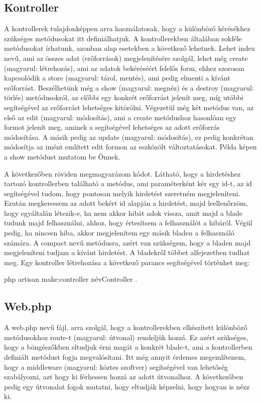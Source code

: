 \documentclass[]{thesis-ekf}
\theoremstyle{definition}
\theoremstyle{remark}
\begin{document}
	\subsection{Kontroller}\label{sc-kontroller}
	A kontrollerek tulajdonképpen arra használatosak, hogy a különböző kérésékhez szükséges metódusokat itt definiálhatjuk. A kontrollerekben általában sokféle metódusokat írhatunk, azonban alap esetekben a következő lehetnek. Lehet index nevű, ami az összes adat (erőforrások) megjelenítésére szolgál, lehet még create (magyarul: létrehozás), ami az adatok bekéréséért felelős form, ehhez szorosan kapcsolódik a store (magyarul: tárol, mentés), ami pedig elmenti a kívánt erőforrást. Beszélhetünk még a show (magyarul: megnéz) és a destroy (magyarul: törlés) metódusokról, az előbbi egy konkrét erőforrást jelenít meg, míg utóbbi segítségével az erőforrást lehetséges kitörölni. Végezetül még két metódus van, az első az edit (magyarul: módosítás), ami a create metódushoz hasonlóan egy formot jelenít meg, aminek a segítségével lehetséges az adott erőforrás módosítása. A másik pedig az update (magyarul: módosítás), ez pedig konkrétan módosítja az imént említett edit formon az eszközölt változtatásokat. Példa képen a show metódust mutatom be Önnek. \cite{Laravel}
	
	
	
	A következőben röviden megmagyarázom  kódot. Látható, hogy a hirdetéshez tartozó kontrollerben található a metódus, ami paraméterként kér egy id-t, az id segítségével tudom, hogy pontosan melyik hirdetést szeretném megjeleníteni. Ezután megkeressem az adott bekért id alapján a hirdetést, majd leellenőrzöm, hogy egyáltalán létezik-e, ha nem akkor hibát adok vissza, amit majd a blade tudunk majd felhasználni, ahhoz, hogy értesítsem a felhasználót a hibáról. Végül pedig, ha nincsen hiba, akkor megjelenítem egy másik bladen a felhasználó számára. A compact nevű metódusra, azért van szükségem, hogy a bladen majd megjeleníteni tudjam a kívánt hirdetést. A bladekről többet  alfejezetben tudhat meg.  Egy kontroller létrehozása a következő parancs segítségével történhet meg:
	\begin{center} 
		php artisan make:controller névController .
	\end{center}
	  
	\subsection{Web.php}
	A web.php nevű fájl, arra szolgál, hogy a kontrollerekben elkészített különböző metódusokhoz route-t (magyarul: útvonal) rendeljük hozzá. Ez azért szükséges, hogy a böngészőkben eltudjuk érni magát a konkrét blade-t, ami a kontrollerben definiált metódust fogja megvalósítani. Itt még annyit érdemes megemlítenem, hogy a middleware (magyarul: köztes szoftver) segítségével van lehetőség szabályozni, azt hogy ki férhessen hozzá az adott útvonalhoz. A következőben pedig egy útvonalat fogok mutatni, hogy eltudják képzelni, hogy hogyan is nézz ki.
	
\end{document}
